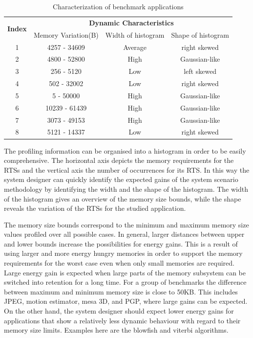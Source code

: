 \documentclass[smallextended]{svjour3}
\begin{document}
\begin{table}
\caption{Characterization of benchmark applications}
\label{tab:app2}
{
\begin{tabular}{|c|c|c|c|}
\hline
\multirow{2}{*}{\textbf{Index}} & \multicolumn{3}{c|}{\textbf{Dynamic Characteristics}} \\ \cline{2-4}
 & Memory Variation(B) & Width of histogram & Shape of histogram\\ 
\hline 
1 & 4257 - 34609 & Average & right skewed \\ 
\hline 
2 & 4800 - 52800 & High & Gaussian-like \\ 
\hline 
3 & 256 - 5120 & Low  & left skewed \\ 
\hline 
4 & 502 - 32002 & Low  & right skewed \\ 
\hline 
5 & 5 - 50000 & High  & Gaussian-like\\ 
\hline 
6 & 10239 - 61439 & High & Gaussian-like \\ 
\hline 
7 & 3073 - 49153 & High  & Gaussian-like \\ 
\hline 
8 & 5121 - 14337 & Low & right skewed \\ 
\hline 
\end{tabular}}
\end{table}

The profiling information can be organised into a histogram in order to be easily comprehensive. 
The horizontal axis depicts the memory requirements for the RTSs and the vertical axis the number of occurrences for its RTS. 
In this way the system designer can quickly identify the expected gains of the system scenario methodology by identifying the width and the shape of the histogram. 
The width of the histogram gives an overview of the memory size bounds, while the shape reveals the variation of the RTSs for the studied application.

The memory size bounds correspond to the minimum and maximum memory size values profiled over all possible cases. 
In general, larger distances between upper and lower bounds increase the possibilities for energy gains. 
This is a result of using larger and more energy hungry memories in order to support the memory requirements for the worst case even when only small memories are required. 
Large energy gain is expected when large parts of the memory subsystem can be switched into retention for a long time. 
For a group of benchmarks the difference between maximum and minimum memory size is close to 50KB. 
This includes JPEG, motion estimator, mesa 3D, and PGP, where large gains can be expected. 
On the other hand, the system designer should expect lower energy gains for applications that show a relatively less dynamic behaviour with regard to their memory size limits. 
Examples here are the blowfish and viterbi algorithms. 
\end{document}
